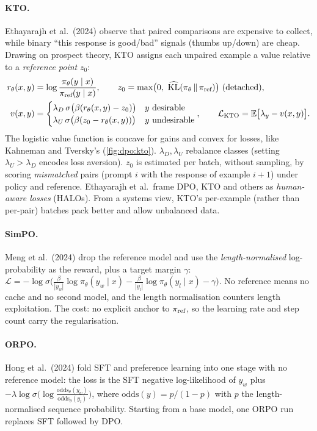 \paragraph{KTO.} Ethayarajh et al.\ (2024) observe that paired comparisons are expensive to
collect, while binary ``this response is good/bad'' signals (thumbs up/down) are cheap. Drawing on
prospect theory, KTO assigns each unpaired example a value relative to a \emph{reference point}
$z_0$:
\begin{align}
r_\theta(x,y)&=\log\frac{\pi_\theta(y\mid x)}{\piref(y\mid x)},\qquad
z_0=\max\!\big(0,\ \widehat{\KL}(\pi_\theta\,\|\,\piref)\big)\ \text{(detached)},\\
v(x,y)&=\begin{cases}\lambda_D\,\sigma\big(\beta(r_\theta(x,y)-z_0)\big) & y\ \text{desirable}\\
\lambda_U\,\sigma\big(\beta(z_0-r_\theta(x,y))\big) & y\ \text{undesirable}\end{cases},\qquad
\mathcal{L}_{\text{KTO}}=\E\big[\lambda_y-v(x,y)\big].
\end{align}
The logistic value function is concave for gains and convex for losses, like Kahneman and
Tversky's (\cref{fig:dpo:kto}). $\lambda_D,\lambda_U$ rebalance classes (setting $\lambda_U>\lambda_D$
encodes loss aversion). $z_0$ is estimated per batch, without sampling, by scoring
\emph{mismatched} pairs (prompt $i$ with the response of example $i{+}1$) under policy and
reference. Ethayarajh et al.\ frame DPO, KTO and others as \emph{human-aware losses} (HALOs).
From a systems view, KTO's per-example (rather than per-pair) batches pack better and allow
unbalanced data.

\paragraph{SimPO.} Meng et al.\ (2024) drop the reference model and use the
\emph{length-normalised} log-probability as the reward, plus a target margin $\gamma$:
$\mathcal{L}=-\log\sigma\big(\frac{\beta}{|y_w|}\log\pi_\theta(y_w\mid x)-\frac{\beta}{|y_l|}\log\pi_\theta(y_l\mid x)-\gamma\big)$.
No reference means no cache and no second model, and the length normalisation counters length
exploitation. The cost: no explicit anchor to $\pi_{\text{ref}}$, so the learning rate and step count
carry the regularisation.

\paragraph{ORPO.} Hong et al.\ (2024) fold SFT and preference learning into one stage with no
reference model: the loss is the SFT negative log-likelihood of $y_w$ plus
$-\lambda\log\sigma\big(\log\frac{\text{odds}_\theta(y_w)}{\text{odds}_\theta(y_l)}\big)$, where
$\text{odds}(y)=p/(1-p)$ with $p$ the length-normalised sequence probability. Starting from a base
model, one ORPO run replaces SFT followed by DPO.

